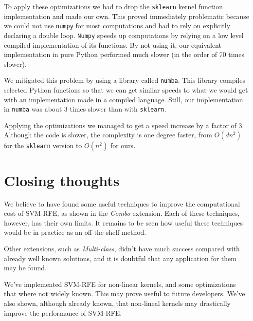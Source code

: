 To apply these optimizations we had to drop the \texttt{sklearn} kernel function im\-ple\-men\-ta\-tion and made our own. This proved immediately problematic because we could not use \texttt{numpy} for most computations and had to rely on explicitly declaring a double loop. \texttt{Numpy} speeds up computations by relying on a low level compiled implementation of its functions. By not using it, our equivalent implementation in pure Python performed much slower (in the order of 70 times slower).

We mitigated this problem by using a library called \texttt{numba}. This library compiles selected Python functions so that we can get similar speeds to what we would get with an implementation made in a compiled language. Still, our implementation in \texttt{numba} was about 3 times slower than with \texttt{sklearn}.

Applying the optimizations we managed to get a speed increase by a factor of 3. Although the code is slower, the complexity is one degree faster, from $O(dn^2)$ for the \texttt{sklearn} version to $O(n^2)$ for ours.

\section{Closing thoughts}

We believe to have found some useful techniques to improve the computational cost of SVM-RFE, as shown in the \emph{Combo} extension. Each of these techniques, however, has their own limits. It remains to be seen how useful these techniques would be in practice as an off-the-shelf method.

Other extensions, such as \emph{Multi-class}, didn't have much success compared with already well known solutions, and it is doubtful that any application for them may be found.

We've implemented SVM-RFE for non-linear kernels, and some optimizations that where not widely known. This may prove useful to future developers. We've also shown, although already known, that non-lineal kernels may drastically improve the performance of SVM-RFE.
